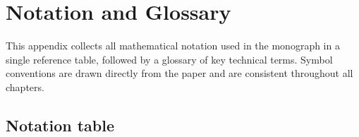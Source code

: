 \chapter{Notation and Glossary}\label{app:notation}

This appendix collects all mathematical notation used in the monograph in a
single reference table, followed by a glossary of key technical terms.  Symbol
conventions are drawn directly from the paper \cite{kbound2026repo} and are
consistent throughout all chapters.

\section{Notation table}
\label{sec:app-notation-table}

